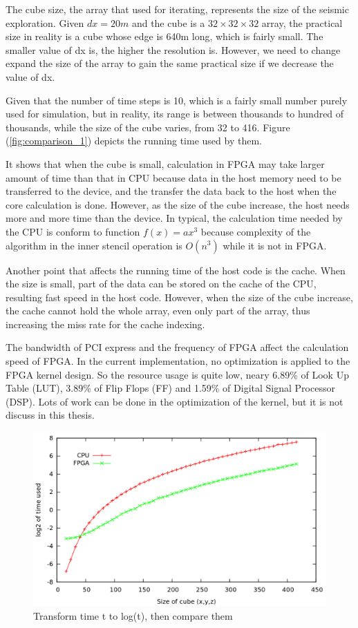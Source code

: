 The cube size, the array that used for iterating, represents the size
of the seismic exploration. Given \ensuremath{dx=20m}
 and the cube is a \ensuremath{32\times32\times32}
 array, the practical size in reality is a cube whose edge is 640m
long, which is fairly small. The smaller value of dx is, the higher
the resolution is. However, we need to change expand the size of the
array to gain the same practical size if we decrease the value of
dx.

Given that the number of time steps is 10, which is a fairly small number
purely used for simulation, but in reality, its range is between thousands
to hundred of thousands, while the size of the cube varies, from 32 to 416.
Figure (\ref{fig:comparison_1}) depicts the running time used by them.

It shows that when the cube is
small, calculation in FPGA may take larger amount of time than that in CPU
because data in the host memory need to be transferred to the device, and
the transfer the data back to the host when the core calculation is done.
However, as the size of the cube increase, the host needs more and more
time than the device. In typical, the calculation time needed by the CPU is
conform to function \( f(x) = ax^3 \) because complexity of the algorithm
in the inner stencil operation is \(O(n^3)\) while it is not in FPGA.

Another point that affects the running time of the host code is the cache.
When the size is small, part of the data can be stored on the cache of the
CPU, resulting fast speed in the host code. However, when the size of the
cube increase, the cache cannot hold the whole array, even only part of the
array, thus increasing the miss rate for the cache indexing.

The bandwidth of PCI express and the frequency of FPGA affect the
calculation speed of FPGA. In the current implementation, no optimization
is applied to the FPGA kernel design. So the resource usage is quite low,
neary 6.89\% of Look Up Table (LUT), 3.89\% of Flip Flops (FF) and 1.59\%
of Digital Signal Processor (DSP). Lots of work can be done in the
optimization of the kernel, but it is not discuss in this thesis.

\begin{figure}
  \centering
  \includegraphics[scale=0.3]{img/t10size16to256_log.png}
  \caption{Transform time t to log(t), then compare them}
  \label{fig:comparison_2}
\end{figure}

